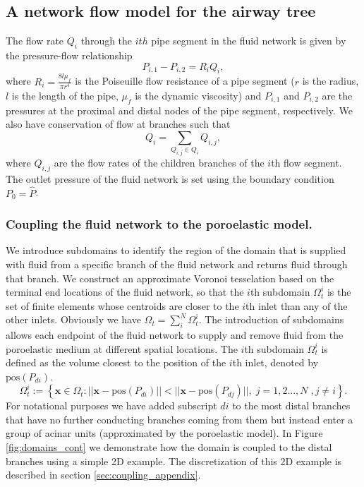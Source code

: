 \subsection{A network flow model for the airway tree}
The flow rate $Q_{i}$ through the $ith$ pipe segment in the fluid network is given by the pressure-flow relationship
\begin{equation}
 \label{pois_flow_eqn}
 P_{i,1} - P_{i,2} = R_{i} Q_{i},
\end{equation}
where $R_{i}=\frac{8l\mu_{f}}{\pi r^{4}}$ is the Poiseuille flow resistance of a pipe segment ($r$ is the radius, $l$ is the length of the pipe, $\mu_{f}$ is the dynamic viscosity) and $P_{i, 1}$ and $P_{i,2}$ are the pressures at the proximal and distal nodes of the pipe segment, respectively. We also have conservation of flow at branches such that
\begin{equation}
 Q_{i}  = \sum_{Q_{i,j} \in Q_{i}} Q_{i,j},
\end{equation}
where $Q_{i,j}$ are the flow rates of the children branches of the $i$th flow segment. The outlet pressure of the fluid network is set using the boundary condition $P_{0}=\hat{P}$.



\subsubsection{Coupling the fluid network to the poroelastic model.}
We introduce subdomains to identify the region of the domain that is supplied with fluid from a specific branch of the fluid network and returns fluid through that branch. We construct an approximate Voronoi tesselation based on the terminal end locations of the fluid network, so that the $i$th subdomain $\Omega_{t}^{i}$ is the set of finite elements whose centroids are closer to the  $i$th inlet than any of the other inlets. Obviously we have $\Omega_{t}=\sum_{i}^{N} \Omega_{t}^{i}$. The introduction of subdomains allows each endpoint of the fluid network to supply and remove fluid from the poroelastic medium at different spatial locations.   
%
%
The $i$th subdomain $\Omega_{t}^{i}$ is defined as the volume closest to the position of the $i$th inlet, denoted by $\mbox{pos}(P_{di})$. 
\begin{equation}
\Omega_{t}^{i} := \left\lbrace \boldsymbol{x} \in \Omega_{t} : ||\boldsymbol{x} -\mbox{pos}(P_{di}) || <  ||\boldsymbol{x} -\mbox{pos}(P_{dj}) ||, \;j=1,2...,N \;, j \neq i \right\rbrace.
 \label{subdomain_definition}
\end{equation}
For notational purposes we have added subscript $di$ to the most distal branches that have no further conducting branches coming from them but instead enter a group of acinar units (approximated by the poroelastic model). In Figure \ref{fig:domains_cont} we demonstrate how the domain is coupled to the distal branches using a simple 2D example. The discretization of this 2D example is described in section \ref{sec:coupling_appendix}.


